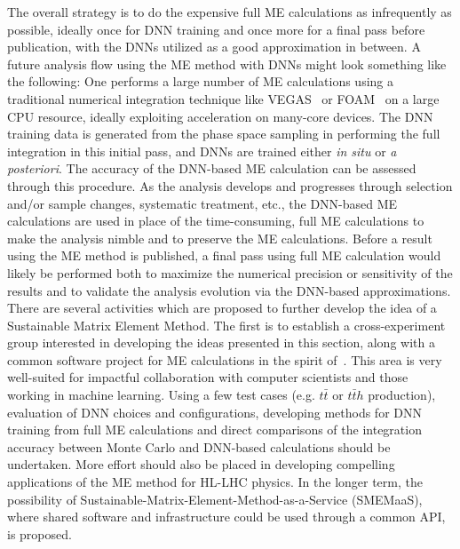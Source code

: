 The overall strategy is to do the expensive full ME calculations as infrequently as possible, ideally once for DNN training and once more for a final pass before publication, with the DNNs utilized as a good approximation in between. A future analysis flow using the ME method with DNNs might look something like the following: One performs a large number of ME calculations using a traditional numerical integration technique like {\sf VEGAS}~\cite{PETERLEPAGE1978192,Ohl:1998jn} or {\sf FOAM}~\cite{JADACH200355} on a large CPU resource, ideally exploiting acceleration on many-core devices. The DNN training data is generated from the phase space sampling in performing the full integration in this initial pass, and DNNs are trained either \emph{in situ} or \emph{a posteriori}. The accuracy of the DNN-based ME calculation can be assessed through this procedure. As the analysis develops and progresses through selection and/or sample changes, systematic treatment, etc., the DNN-based ME calculations are used in place of the time-consuming, full ME calculations to make the analysis nimble and to preserve the ME calculations. Before a result using the ME method is published, a final pass using full ME calculation would likely be performed both to maximize the numerical precision or sensitivity of the results and to validate the analysis evolution via the DNN-based approximations.\\

There are several activities which are proposed to further develop the idea of a Sustainable Matrix Element Method. The first is to establish a cross-experiment group interested in developing the ideas presented in this section, along with a common software project for ME calculations in the spirit of~\cite{MoMEMta}. This area is very well-suited for impactful collaboration with computer scientists and those working in machine learning. Using a few test cases (e.g. $t\bar{t}$ or $t\bar{t}h$ production), evaluation of DNN choices and configurations, developing methods for DNN training from full ME calculations and direct comparisons of the integration accuracy between Monte Carlo and DNN-based calculations should be undertaken. More effort should also be placed in developing compelling applications of the ME method for HL-LHC physics. In the longer term, the possibility of Sustainable-Matrix-Element-Method-as-a-Service (SMEMaaS), where shared software and infrastructure could be used through a common API, is proposed.

